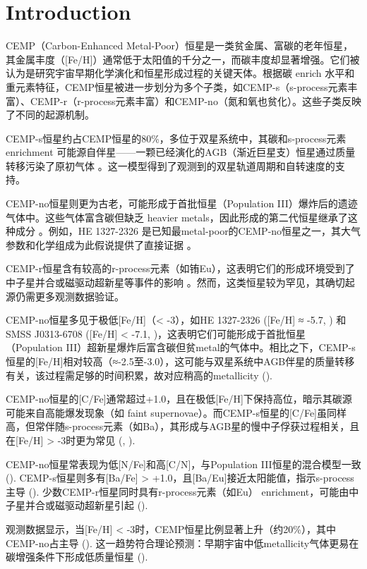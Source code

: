 \section{Introduction}
CEMP（Carbon-Enhanced Metal-Poor）恒星是一类贫金属、富碳的老年恒星，其金属丰度（[Fe/H]）通常低于太阳值的千分之一，而碳丰度却显著增强。它们被认为是研究宇宙早期化学演化和恒星形成过程的关键天体。根据碳 enrich 水平和重元素特征，CEMP恒星被进一步划分为多个子类，如CEMP-s（s-process元素丰富）、CEMP-r（r-process元素丰富）和CEMP-no（氮和氧也贫化）。这些子类反映了不同的起源机制。

CEMP-s恒星约占CEMP恒星的80\%，多位于双星系统中，其碳和s-process元素 enrichment 可能源自伴星——一颗已经演化的AGB（渐近巨星支）恒星通过质量转移污染了原初气体 \cite{abia2002}。这一模型得到了观测到的双星轨道周期和自转速度的支持。

CEMP-no恒星则更为古老，可能形成于首批恒星（Population III）爆炸后的遗迹气体中。这些气体富含碳但缺乏 heavier metals，因此形成的第二代恒星继承了这种成分 \cite{christlieb2002}。例如，HE 1327-2326 是已知最metal-poor的CEMP-no恒星之一，其大气参数和化学组成为此假说提供了直接证据 \cite{ito2009}。

CEMP-r恒星含有较高的r-process元素（如铕Eu），这表明它们的形成环境受到了中子星并合或磁驱动超新星等事件的影响 \cite{hansen2011}。然而，这类恒星较为罕见，其确切起源仍需更多观测数据验证。

CEMP-no恒星多见于极低[Fe/H]（< -3），如HE 1327-2326 ([Fe/H] ≈ -5.7, \cite{ito2009}) 和 SMSS J0313-6708 ([Fe/H] < -7.1, \cite{keller2014})，这表明它们可能形成于首批恒星（Population III）超新星爆炸后富含碳但贫metal的气体中。相比之下，CEMP-s恒星的[Fe/H]相对较高（≈-2.5至-3.0），这可能与双星系统中AGB伴星的质量转移有关，该过程需足够的时间积累，故对应稍高的metallicity (\cite{lucatello2005}).

CEMP-no恒星的[C/Fe]通常超过+1.0，且在极低[Fe/H]下保持高位，暗示其碳源可能来自高能爆发现象（如 faint supernovae）。而CEMP-s恒星的[C/Fe]虽同样高，但常伴随s-process元素（如Ba），其形成与AGB星的慢中子俘获过程相关，且在[Fe/H] > -3时更为常见 (\cite{abia2002}, \cite{bisterzo2011}).

CEMP-no恒星常表现为低[N/Fe]和高[C/N]，与Population III恒星的混合模型一致 (\cite{norris2013}). CEMP-s恒星则多有[Ba/Fe] > +1.0，且[Ba/Eu]接近太阳能值，指示s-process主导 (\cite{masseron2010}). 少数CEMP-r恒星同时具有r-process元素（如Eu） enrichment，可能由中子星并合或磁驱动超新星引起 (\cite{hansen2011}).

观测数据显示，当[Fe/H] < -3时，CEMP恒星比例显著上升（约20\%），其中CEMP-no占主导 (\cite{yoon2016}). 这一趋势符合理论预测：早期宇宙中低metallicity气体更易在碳增强条件下形成低质量恒星 (\cite{frebel2015}).

